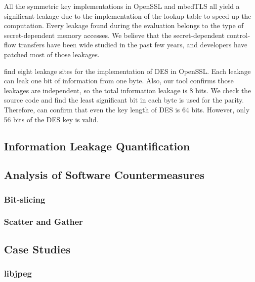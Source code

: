 All the symmetric key implementations in OpenSSL and mbedTLS all yield
a significant leakage due to the implementation of the lookup table
to speed up the computation. Every leakage found during the evaluation
belongs to the type of secret-dependent memory accesses. We believe that
the secret-dependent control-flow transfers have been wide studied in
the past few years, and developers have patched most of those leakages. 

\tool{} find eight leakage sites for the implementation of DES in OpenSSL.
Each leakage can leak one bit of information from one byte. Also, our tool
confirms those leakages are independent, so the total information leakage
is 8 bits. We check the source code and find the least significant
bit in each byte is used for the parity. Therefore, \tool{} can confirm
that even the key length of DES is 64 bits. However, only 56 bits of the 
DES key is valid.


\subsection{Information Leakage Quantification}
\subsection{Analysis of Software Countermeasures}
\subsubsection{Bit-slicing}
\subsubsection{Scatter and Gather}
\subsection{Case Studies}
\subsubsection{libjpeg}

